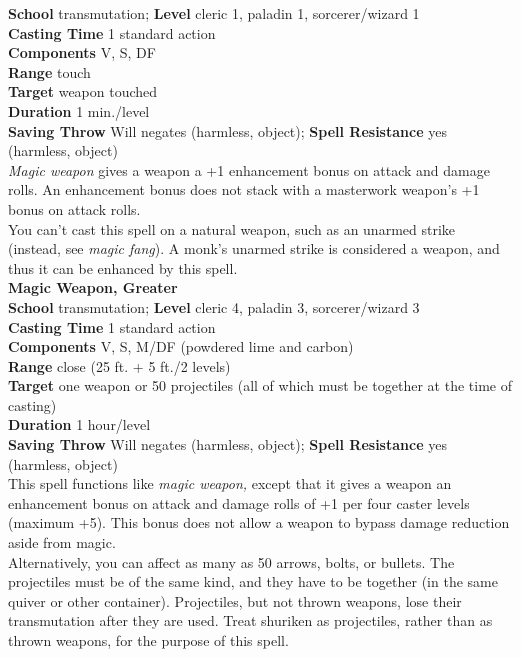 \textbf{School} transmutation; \textbf{Level} cleric 1, paladin 1, sorcerer/wizard 1\\
\textbf{Casting Time} 1 standard action\\
\textbf{Components} V, S, DF\\
\textbf{Range} touch\\
\textbf{Target }weapon touched\\
\textbf{Duration} 1 min./level\\
\textbf{Saving Throw }Will negates (harmless, object); \textbf{Spell Resistance} yes (harmless, object)\\
\textit{Magic weapon }gives a weapon a +1 enhancement bonus on attack and damage rolls. An enhancement bonus does not stack with a masterwork weapon's +1 bonus on attack rolls.\\
You can't cast this spell on a natural weapon, such as an unarmed strike (instead, see \textit{magic fang}). A monk's unarmed strike is considered a weapon, and thus it can be enhanced by this spell.\\
\textbf{Magic Weapon, Greater}\\
\textbf{School} transmutation; \textbf{Level} cleric 4, paladin 3, sorcerer/wizard 3\\
\textbf{Casting Time} 1 standard action\\
\textbf{Components} V, S, M/DF (powdered lime and carbon)\\
\textbf{Range} close (25 ft. + 5 ft./2 levels)\\
\textbf{Target} one weapon or 50 projectiles (all of which must be together at the time of casting)\\
\textbf{Duration} 1 hour/level\\
\textbf{Saving Throw }Will negates (harmless, object); \textbf{Spell Resistance} yes (harmless, object)\\
This spell functions like \textit{magic weapon, }except that it gives a weapon an enhancement bonus on attack and damage rolls of +1 per four caster levels (maximum +5). This bonus does not allow a weapon to bypass damage reduction aside from magic.\\
Alternatively, you can affect as many as 50 arrows, bolts, or bullets. The projectiles must be of the same kind, and they have to be together (in the same quiver or other container). Projectiles, but not thrown weapons, lose their transmutation after they are used. Treat shuriken as projectiles, rather than as thrown weapons, for the purpose of this spell.\\
